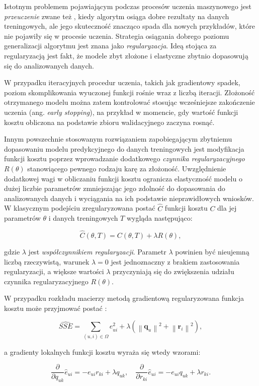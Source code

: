 \documentclass{pracamgr}
\newcommand{\norm}[1]{\left\lVert#1\right\rVert}
\begin{document}
Istotnym problemem pojawiającym podczas procesów uczenia maszynowego jest \textit{przeuczenie} zwane też , kiedy algorytm osiąga dobre rezultaty na danych treningowych, ale jego skuteczność znacząco spada dla nowych przykładów, które nie pojawiły się w procesie uczenia. Strategia osiągania dobrego poziomu generalizacji algorytmu jest znana jako \textit{regularyzacja}. Ideą stojąca za regularyzacją jest fakt, że modele zbyt złożone i elastyczne zbytnio dopasowują się do analizowanych danych. 

W przypadku iteracyjnych procedur uczenia, takich jak gradientowy spadek, poziom skomplikowania wyuczonej funkcji rośnie wraz z liczbą iteracji. Złożoność otrzymanego modelu można zatem kontrolować stosując wcześniejsze zakończenie uczenia (ang. \textit{early stopping}), na przykład w momencie, gdy wartość funkcji kosztu obliczona na podstawie zbioru walidacyjnego zaczyna rosnąć.

Innym powszechnie stosowanym rozwiązaniem zapobiegającym zbytniemu dopasowaniu modelu predykcyjnego do danych treningowych jest modyfikacja funkcji kosztu poprzez wprowadzanie dodatkowego \textit{czynnika regularyzacyjnego} $R(\theta)$ stanowiącego pewnego rodzaju karę za złożoność. Uwzględnienie dodatkowej wagi w obliczaniu funkcji kosztu ogranicza elastyczność modelu o dużej liczbie parametrów zmniejszając jego zdolność do dopasowania do analizowanych danych i wyciągania na ich podstawie nieprawidłowych wniosków. W klasycznym podejściu zregularyzowana postać $\hat{C}$ funkcji kosztu $C$ dla jej parametrów $\theta$ i danych treningowych $T$ wygląda następująco:

\[
\hat{C}(\theta, T) = C(\theta, T) + \lambda R(\theta),
\]

gdzie $\lambda$ jest \textit{współczynnikiem regularyzacji}. Parametr $\lambda$ powinien być nieujemną liczbą rzeczywistą, warunek $\lambda = 0$ jest jednoznaczny z brakiem zastosowania regularyzacji, a większe wartości $\lambda$ przyczyniają się do zwiększenia udziału czynnika regularyzacyjnego $R(\theta)$.

W przypadku rozkładu macierzy metodą gradientową regularyzowana funkcja kosztu może przyjmować postać \cite{takacs}:

\[
\hat{SSE} = \sum_{(u,i) \in \Omega} e_{ui}^2 + \lambda (\norm{\mathbf{q}_{u}}^2 + \norm{\mathbf{r}_{i}}^2),
\]

a gradienty lokalnych funkcji kosztu wyraża się wtedy wzorami:

\[
\frac{\partial}{\partial q_{uk}}\hat{e}_{ui} = -e_{ui} r_{ki} + \lambda q_{uk}, \quad
\frac{\partial}{\partial r_{ki}}\hat{e}_{ui} = -e_{ui} q_{uk} + \lambda r_{ki}.
\]
\end{document}
